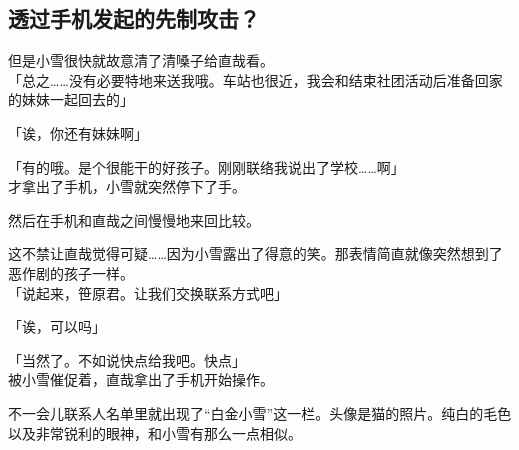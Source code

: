 \subsection{透过手机发起的先制攻击？}

但是小雪很快就故意清了清嗓子给直哉看。\\

「总之……没有必要特地来送我哦。车站也很近，我会和结束社团活动后准备回家的妹妹一起回去的」

「诶，你还有妹妹啊」

「有的哦。是个很能干的好孩子。刚刚联络我说出了学校……啊」\\

才拿出了手机，小雪就突然停下了手。

然后在手机和直哉之间慢慢地来回比较。

这不禁让直哉觉得可疑……因为小雪露出了得意的笑。那表情简直就像突然想到了恶作剧的孩子一样。\\

「说起来，笹原君。让我们交换联系方式吧」

「诶，可以吗」

「当然了。不如说快点给我吧。快点」\\

被小雪催促着，直哉拿出了手机开始操作。

不一会儿联系人名单里就出现了“白金小雪”这一栏。头像是猫的照片。纯白的毛色以及非常锐利的眼神，和小雪有那么一点相似。\\

